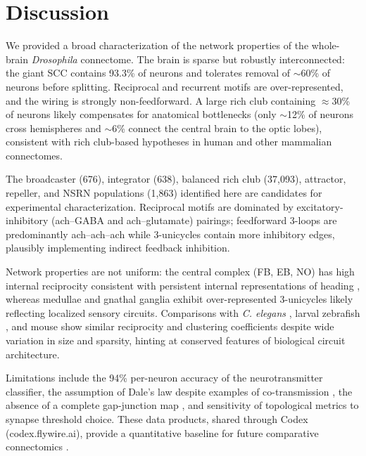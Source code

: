 \documentclass[11pt]{article}
\begin{document}
\section{Discussion}
We provided a broad characterization of the network properties of the whole-brain \emph{Drosophila} connectome. The brain is sparse but robustly interconnected: the giant SCC contains 93.3\% of neurons and tolerates removal of $\sim$60\% of neurons before splitting. Reciprocal and recurrent motifs are over-represented, and the wiring is strongly non-feedforward. A large rich club containing $\approx$30\% of neurons likely compensates for anatomical bottlenecks (only $\sim$12\% of neurons cross hemispheres and $\sim$6\% connect the central brain to the optic lobes), consistent with rich club-based hypotheses in human \cite{vandenheuvel2011richclub,harriger2012richclub} and other mammalian connectomes.

The broadcaster (676), integrator (638), balanced rich club (37{,}093), attractor, repeller, and NSRN populations (1{,}863) identified here are candidates for experimental characterization. Reciprocal motifs are dominated by excitatory-inhibitory (ach--GABA and ach--glutamate) pairings; feedforward 3-loops are predominantly ach--ach--ach while 3-unicycles contain more inhibitory edges, plausibly implementing indirect feedback inhibition.

Network properties are not uniform: the central complex (FB, EB, NO) has high internal reciprocity consistent with persistent internal representations of heading \cite{seelig2015neural,kim2017ring,fisher2019sensorimotor}, whereas medullae and gnathal ganglia exhibit over-represented 3-unicycles likely reflecting localized sensory circuits. Comparisons with \emph{C. elegans} \cite{varshney2011structural,cook2019whole}, larval zebrafish \cite{vishwanathan2017electron}, and mouse \cite{motta2019dense} show similar reciprocity and clustering coefficients despite wide variation in size and sparsity, hinting at conserved features of biological circuit architecture.

Limitations include the 94\% per-neuron accuracy of the neurotransmitter classifier, the assumption of Dale's law despite examples of co-transmission \cite{croset2018cellular,hobert2016neurotransmitter,lacin2019neurotransmitter,bhaskar2024coexpression}, the absence of a complete gap-junction map \cite{jacobs2015gap,baskaran2023electrical,phelps2021gap}, and sensitivity of topological metrics to synapse threshold choice. These data products, shared through Codex (codex.flywire.ai), provide a quantitative baseline for future comparative connectomics \cite{schlegel2023wholebrain,phelps2021reconstruction,azevedo2022connectome}.



\end{document}
